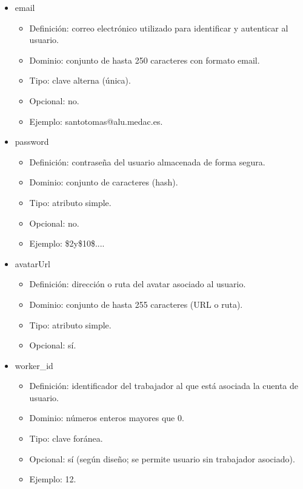\begin{itemize}
\begin{itemize}
        \item email
        \begin{itemize}
            \item Definición: correo electrónico utilizado para identificar y autenticar al usuario.
            \item Dominio: conjunto de hasta 250 caracteres con formato email.
            \item Tipo: clave alterna (única).
            \item Opcional: no.
            \item Ejemplo: santotomas@alu.medac.es.
        \end{itemize}

        \item password
        \begin{itemize}
            \item Definición: contraseña del usuario almacenada de forma segura.
            \item Dominio: conjunto de caracteres (hash).
            \item Tipo: atributo simple.
            \item Opcional: no.
            \item Ejemplo: \$2y\$10\$....
        \end{itemize}

        \item avatarUrl
        \begin{itemize}
            \item Definición: dirección o ruta del avatar asociado al usuario.
            \item Dominio: conjunto de hasta 255 caracteres (URL o ruta).
            \item Tipo: atributo simple.
            \item Opcional: sí.
        \end{itemize}

        \item worker\_id
        \begin{itemize}
            \item Definición: identificador del trabajador al que está asociada la cuenta de usuario.
            \item Dominio: números enteros mayores que 0.
            \item Tipo: clave foránea.
            \item Opcional: sí (según diseño; se permite usuario sin trabajador asociado).
            \item Ejemplo: 12.
        \end{itemize}
    \end{itemize}


\end{itemize}
